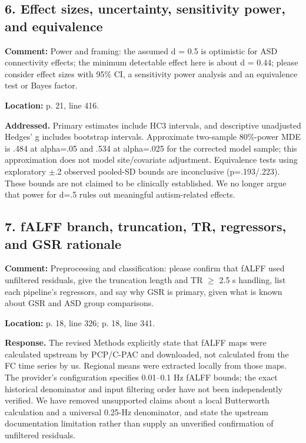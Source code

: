 \documentclass[11pt]{article}
\begin{document}
\subsection*{6. Effect sizes, uncertainty, sensitivity power, and equivalence}

\textbf{Comment:} Power and framing: the assumed d = 0.5 is optimistic for ASD connectivity effects; the minimum detectable effect here is about d = 0.44; please consider effect sizes with 95\% CI, a sensitivity power analysis and an equivalence test or Bayes factor.


\textbf{Location:} p. 21, line 416.


 \textbf{Addressed.} Primary estimates include HC3 intervals, and descriptive unadjusted Hedges' g includes bootstrap intervals. Approximate two-sample 80\%-power MDE is .484 at alpha=.05 and .534 at alpha=.025 for the corrected model sample; this approximation does not model site/covariate adjustment. Equivalence tests using exploratory $\pm$.2 observed pooled-SD bounds are inconclusive (p=.193/.223). These bounds are not claimed to be clinically established. We no longer argue that power for d=.5 rules out meaningful autism-related effects.


\subsection*{7. fALFF branch, truncation, TR, regressors, and GSR rationale}

\textbf{Comment:} Preprocessing and classification: please confirm that fALFF used unfiltered residuals, give the truncation length and TR $\geq$ 2.5 s handling, list each pipeline’s regressors, and say why GSR is primary, given what is known about GSR and ASD group comparisons.


\textbf{Location:} p. 18, line 326; p. 18, line 341.


 \textbf{Response.} The revised Methods explicitly state that fALFF maps were calculated upstream by PCP/C-PAC and downloaded, not calculated from the FC time series by us. Regional means were extracted locally from those maps. The provider's configuration specifies 0.01--0.1 Hz fALFF bounds; the exact historical denominator and input filtering order have not been independently verified. We have removed unsupported claims about a local Butterworth calculation and a universal 0.25-Hz denominator, and state the upstream documentation limitation rather than supply an unverified confirmation of unfiltered residuals.
\end{document}
